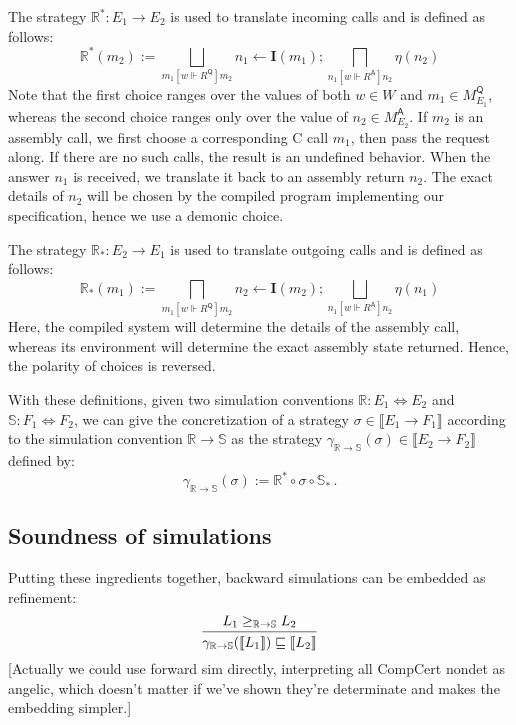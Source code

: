 \documentclass[format=sigplan,authordraft]{acmart}
\newcommand{\kw}[1]{\ensuremath{ \mathsf{#1} }}
\newcommand{\ifr}[1]{\mathrel{[{#1}]}}
\begin{document}
The strategy $\mathbb{R}^* : E_1 \rightarrow E_2$
is used to translate incoming calls
and is defined as follows:
\[
    \mathbb{R}^*(m_2) :=
       \bigsqcup_{m_1 \ifr{w \Vdash R^\kw{Q}} m_2}
       n_1 \leftarrow \mathbf{I}(m_1) ;
       \bigsqcap_{n_1 \ifr{w \Vdash R^\kw{A}} n_2}
       \eta(n_2)
\]
Note that the first choice ranges over the values of both
$w \in W$ and $m_1 \in M_{E_1}^\kw{Q}$,
whereas the second choice ranges only over the value of
$n_2 \in M_{E_2}^\kw{A}$.
If $m_2$ is an assembly call,
we first choose a corresponding C call $m_1$,
then pass the request along.
If there are no such calls,
the result is an undefined behavior.
When the answer $n_1$ is received,
we translate it back to an assembly return $n_2$.
The exact details of $n_2$ will be chosen by
the compiled program implementing our specification,
hence we use a demonic choice.

The strategy $\mathbb{R}_* : E_2 \rightarrow E_1$
is used to translate outgoing calls
and is defined as follows:
\[
    \mathbb{R}_*(m_1) :=
       \bigsqcap_{m_1 \ifr{w \Vdash R^\kw{Q}} m_2}
       n_2 \leftarrow \mathbf{I}(m_2) ;
       \bigsqcup_{n_1 \ifr{w \Vdash R^\kw{A}} n_2}
       \eta(n_1)
\]
Here,
the compiled system will determine
the details of the assembly call,
whereas its environment will determine
the exact assembly state returned.
Hence, the polarity of choices is reversed.

With these definitions,
given two simulation conventions
$\mathbb{R} : E_1 \Leftrightarrow E_2$ and
$\mathbb{S} : F_1 \Leftrightarrow F_2$,
we can give the concretization of a strategy
$\sigma \in \llbracket E_1 \rightarrow F_1 \rrbracket$
according to the simulation convention
$\mathbb{R} \rightarrow \mathbb{S}$
as the strategy
$\gamma_{\mathbb{R} \rightarrow \mathbb{S}}(\sigma) \in
  \llbracket E_2 \rightarrow F_2 \rrbracket$
defined by:
\[
    \gamma_{\mathbb{R} \rightarrow \mathbb{S}}(\sigma) :=
    \mathbb{R}^* \circ \sigma \circ \mathbb{S}_* \,.
\]


\subsection{Soundness of simulations} %

Putting these ingredients together,
backward simulations can be embedded as refinement:
\[
  \begin{prooftree}
    \hypo{L_1 \ge_{\mathbb{R} \rightarrow \mathbb{S}} L_2}
    \infer1{\gamma_{\mathbb{R} \rightarrow \mathbb{S}}
                (\llbracket L_1 \rrbracket) \sqsubseteq
                \llbracket L_2 \rrbracket}
  \end{prooftree}
\]
[Actually we could use forward sim directly,
interpreting all CompCert nondet as angelic,
which doesn't matter if we've shown they're determinate
and makes the embedding simpler.]
\end{document}
